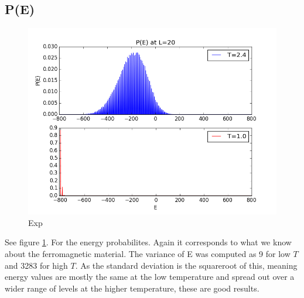 \documentclass[norsk, 10pt, twocolumn, a4paper]{revtex4}
\begin{document}
\subsection{P(E)}
\begin{figure}
    \includegraphics[width=0.9\linewidth]{E_count.png}
    \caption{
        \label{fig:d1}
        Exp}
\end{figure}
See figure \ref{fig:d1}. For the energy probabilites. Again it corresponds to what we know
about the ferromagnetic material. The variance of E was computed as 9 for low $T$ and
3283 for high $T$. As the standard deviation is the squareroot of this, meaning energy values
are mostly the same at the low temperature and spread out over a wider range of levels at the
higher temperature, these are good results.
\end{document}
